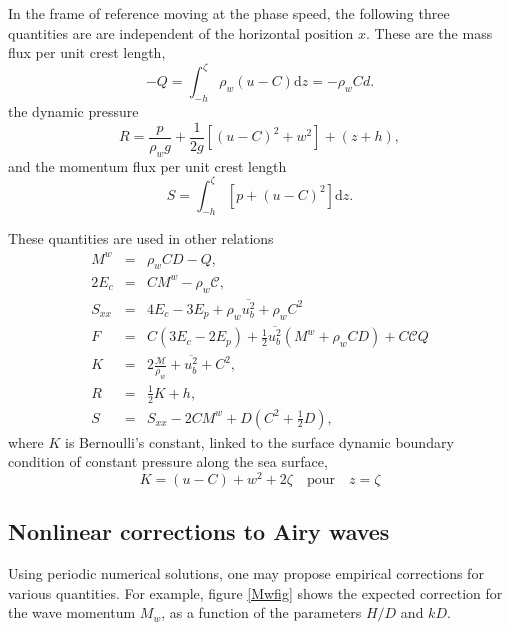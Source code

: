In the frame of reference moving at the phase speed, the following three quantities are are independent of the horizontal position  $x$. These are 
the mass flux per unit crest length, 
\begin{equation}
-Q=\int_{-h}^{\zeta} \rho_w \left(u-C\right) {\mathrm d}z = - \rho_w C d .
\end{equation}
the dynamic pressure 
\begin{equation}
R=\frac{p}{\rho_w g} +
\frac{1}{2g}\left[\left(u-C\right)^2+w^2\right]+\left(z+h\right),
\end{equation}
and the momentum flux per unit crest length 
\begin{equation}
S=\int_{-h}^{\zeta}\left[p+\left(u-C\right)^2\right]{\mathrm d}z.
\end{equation}

These quantities are used in other relations 
\begin{eqnarray}
M^w&=&\rho_w C D - Q, \\
2 E_c &=& C M^w - \rho_w \mathcal{C} , \\
S_{xx}&=&4 E_c - 3 E_p+\rho_w \overline{u_b^2}+\rho_w C^2 \\
F&=& C \left(3 E_c - 2 E_p\right)+\frac{1}{2}
\overline{u_b^2}\left(M^w+\rho_w C D\right) + C\mathcal{C}Q \\
K&=&2 \frac{\mathcal{M}}{\rho_w}+\overline{u_b^2}+C^2, \\
R&=&\frac{1}{2}K + h, \\
S&=&S_{xx}-2C M^w +D \left(C^2+\frac{1}{2}D\right),
\end{eqnarray}
where $K$ is Bernoulli's constant, linked to the surface dynamic boundary condition of constant pressure along the sea surface,
\begin{equation}
K=\left(u-C\right)+w^2 + 2 \zeta \quad \mathrm{pour} \quad
z=\zeta
\end{equation}

\subsection{Nonlinear corrections to Airy waves}
Using periodic numerical solutions, one may propose empirical corrections for various quantities. For example, 
figure \ref{Mwfig} shows the expected correction for the wave momentum $M_w$, as a function of the  parameters $H/D$  and $kD$.

